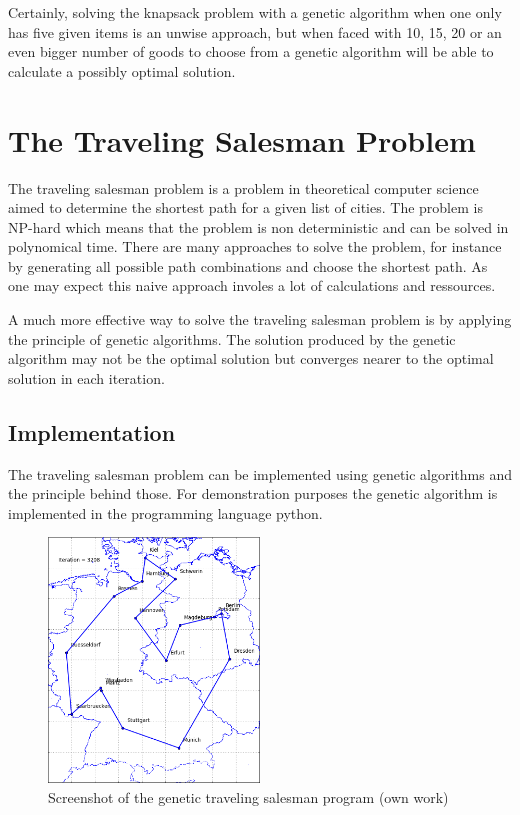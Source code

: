 \documentclass[11pt,a4paper]{article}
\begin{document}
Certainly, solving the knapsack problem with a genetic algorithm when one only has five given items is an unwise approach, but when faced with 10, 15, 20 or an even bigger number of goods to choose from a genetic algorithm will be able to calculate a possibly optimal solution.

\section{The Traveling Salesman Problem}

The traveling salesman problem is a problem in theoretical computer science aimed to determine the shortest path for a given list of cities. The problem is NP-hard which means that the problem is non deterministic and can be solved in polynomical time. There are many approaches to solve the problem, for instance by generating all possible path combinations and choose the shortest path. As one may expect this naive approach involes a lot of calculations and ressources.

A much more effective way to solve the traveling salesman problem is by applying the principle of genetic algorithms. The solution produced by the genetic algorithm may not be the optimal solution but converges nearer to the optimal solution in each iteration. 

\subsection{Implementation}

The traveling salesman problem can be implemented using genetic algorithms and the principle behind those. For demonstration purposes the genetic algorithm is implemented in the programming language python.

\begin{figure}[h!]
  \centering
  \includegraphics[width=0.5\textwidth]{tsp.png}
  \caption{Screenshot of the genetic traveling salesman program (own work)}
  \label{ks}
\end{figure}
\end{document}
